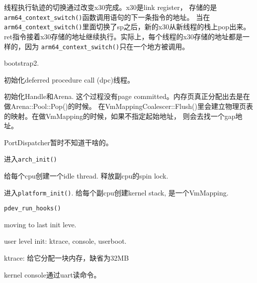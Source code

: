 线程执行轨迹的切换通过改变x30完成。x30是link register，
存储的是\verb|arm64_context_switch()|函数调用语句的下一条指令的地址。
当在\verb|arm64_context_switch()|里面切换了sp之后，新的x30从新线程的栈上pop出来。
ret指令接着x30存储的地址继续执行。实际上，每个线程的x30存储的地址都是一样的，因为
\verb|arm64_context_switch()|只在一个地方被调用。

bootstrap2.

初始化deferred procedure call (dpc)线程。

初始化Handle和Arena. 这个过程没有page committed。内存页真正分配出去是在做Arena::Pool::Pop()的时候。
在VmMappingCoalescer::Flush()里会建立物理页表的映射。在做VmMapping的时候，如果不指定起始地址，
则会去找一个gap地址。

PortDispatcher暂时不知道干啥的。

进入\verb|arch_init()|

给每个cpu创建一个idle thread.  释放副cpu的spin lock.

进入\verb|platform_init()|. 给每个副cpu创建kernel stack, 是一个VmMapping.

\verb|pdev_run_hooks()|

moving to last init leve.

user level init: ktrace, console, userboot.

ktrace: 给它分配一块内存，缺省为32MB

kernel console通过uart读命令。















